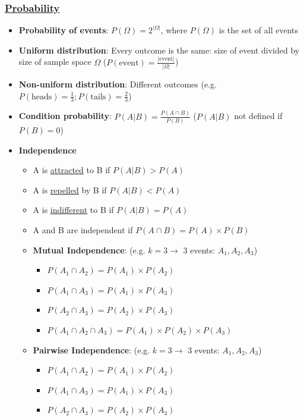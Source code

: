 \documentclass[8pt]{extarticle}
\begin{document}
\subsubsection*{\underline{Probability}}
\begin{itemize}
    \item \textbf{Probability of events}: $P(\Omega)=2^{|\Omega|}$, where $P(\Omega)$ is the set
    of all events
    \item \textbf{Uniform distribution}: Every outcome is the same: size of event divided by size of sample space $\Omega$
    ($P(\text{event})=\frac{|\text{event}|}{|\Omega|}$)
    \item \textbf{Non-uniform distribution}: Different outcomes 
    (e.g. $P(\text{heads})=\frac{1}{3}; P(\text{tails})=\frac{2}{3}$)
    \item \textbf{Condition probability}: $P(A|B)=\frac{P(A\cap B)}{P(B)}$ ($P(A|B)$ not defined 
    if $P(B)=0$)
    \item \textbf{Independence}
    \begin{itemize}
        \item A is \underline{attracted} to B if $P(A|B)>P(A)$
        \item A is \underline{repelled} by B if $P(A|B)<P(A)$
        \item A is \underline{indifferent} to B if $P(A|B)=P(A)$
        \item A and B are independent if $P(A\cap B)=P(A)\times P(B)$
        \item \textbf{Mutual Independence}: (e.g. $k=3\rightarrow$ 3 events: $A_1,A_2,A_3$) 
        \begin{itemize}
            \item $P(A_1\cap A_2)=P(A_1)\times P(A_2)$
            \item $P(A_1\cap A_3)=P(A_1)\times P(A_3)$
            \item $P(A_2\cap A_3)=P(A_2)\times P(A_3)$
            \item $P(A_1\cap A_2\cap A_3)=P(A_1)\times P(A_2)\times P(A_3)$
        \end{itemize}
        \item \textbf{Pairwise Independence}: (e.g. $k=3\rightarrow$ 3 events: $A_1,A_2,A_3$)
        \begin{itemize}
            \item $P(A_1\cap A_2)=P(A_1)\times P(A_2)$
            \item $P(A_1\cap A_3)=P(A_1)\times P(A_3)$
            \item $P(A_2\cap A_3)=P(A_2)\times P(A_3)$

\end{itemize}
\end{itemize}
\end{itemize}
\end{document}
